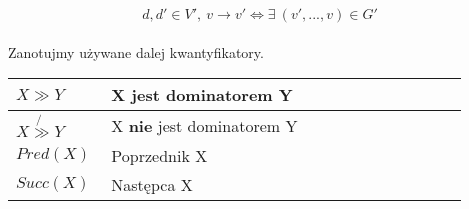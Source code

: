 		$$d, d' \in V', \ v \rightarrow v' \iff \exists \ (v', ..., v) \in G' $$
		\\

		Zanotujmy używane dalej kwantyfikatory.
		
	    \begin{center}
		    \setlength{\tabcolsep}{0.5em}
		    \renewcommand{\arraystretch}{1.5}
		    \begin{tabular}{| L{0.2\linewidth} | L{0.75\linewidth} | }
			    \hline
			    $X \gg Y$ & X jest dominatorem Y \\
			    \hline
			    $X \not{\gg} Y$ & X \textbf{nie} jest dominatorem Y \\
			    \hline
			    $Pred(X)$ & Poprzednik X \\
			    \hline
			    $Succ(X)$ & Następca X \\
			    \hline
		    \end{tabular}
	    \end{center}

		